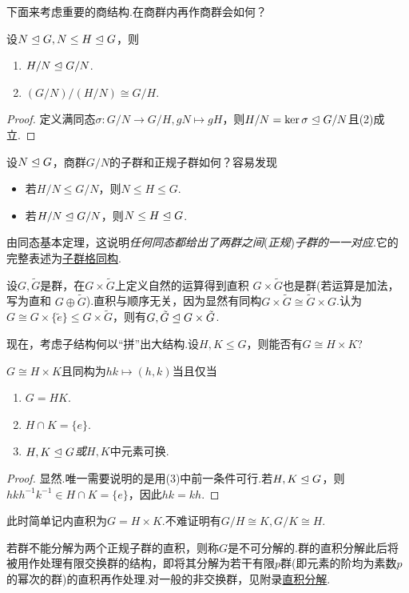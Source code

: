 下面来考虑重要的商结构.在商群内再作商群会如何？
\begin{thm}[(第二群同构)]
	设$N\trianglelefteq G,N\le H\trianglelefteq G$，则
	\begin{enumerate}
		\item $H/N\trianglelefteq G/N$.
		\item $(G/N)/(H/N)\cong G/H$.
	\end{enumerate}
\end{thm}
\begin{proof}
	定义满同态$\sigma\colon G/N\to G/H,gN\mapsto gH$，则$H/N=\ker\sigma\trianglelefteq G/N$且(2)成立.
\end{proof}

设$N\trianglelefteq G$，商群$G/N$的子群和正规子群如何？容易发现
\begin{itemize}
	\item 若$H/N\le G/N$，则$N\le H\le G$.
	\item 若$H/N\trianglelefteq G/N$，则$N\le H\trianglelefteq G$.
\end{itemize}
由同态基本定理，这说明\emph{任何同态都给出了两群之间}(\emph{正规})\emph{子群的一一对应}.它的完整表述为\hyperlink{thm:LatticeIso}{子群格同构}.

\medskip 设$G,\tilde{G}$是群，在$G\times\tilde{G}$上定义自然的运算得到{\heiti 直积} $G\times\tilde{G}$也是群(若运算是加法，写为{\heiti 直和} $G\oplus\tilde{G}$).直积与顺序无关，因为显然有同构$G\times\tilde{G}\cong\tilde{G}\times G$.认为$G\cong G\times\{\tilde{e}\}\le G\times\tilde{G}	$，则有$G,\tilde{G}\trianglelefteq G\times\tilde{G}$.

现在，考虑子结构何以“拼”出大结构.设$H,K\le G$，则能否有$G\cong H\times K$?
\begin{prop}[(内直积)]
	$G\cong H\times K$且同构为$hk\mapsto(h,k)$当且仅当
	\begin{enumerate}
		\item $G=HK$.
		\item $H\cap K=\{e\}$.
		\item $H,K\trianglelefteq G$\emph{或}$H,K$中元素可换.
	\end{enumerate}
\end{prop}
\begin{proof}
	显然.唯一需要说明的是用(3)中前一条件可行.若$H,K\trianglelefteq G$，则$hkh^{-1}k^{-1}\in H\cap K=\{e\}$，因此$hk=kh$.
\end{proof}

此时简单记内直积为$G=H\times K$.不难证明有$G/H\cong K,G/K\cong H$.

\medskip 若群不能分解为两个正规子群的直积，则称$G$是{\heiti 不可分解的}.群的直积分解此后将被用作处理有限交换群的结构，即将其分解为若干有限$p${\heiti 群}(即元素的阶均为素数$p$的幂次的群)的直积再作处理.对一般的非交换群，见附录\hyperlink{subsec:DirectDecomposition}{直积分解}.

